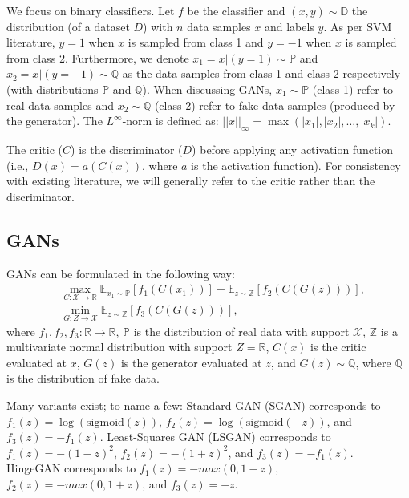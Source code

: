 \documentclass{article}
\begin{document}
We focus on binary classifiers. Let $f$ be the classifier and $(x,y) \sim \mathbb{D}$ the distribution (of a dataset $D$) with $n$ data samples $x$ and labels $y$. As per SVM literature, $y=1$ when $x$ is sampled from class 1 and $y=-1$ when $x$ is sampled from class 2. Furthermore, we denote $x_1 = x | (y = 1) \sim \mathbb{P}$ and $x_2 = x | (y = -1) \sim \mathbb{Q}$ as the data samples from class 1 and class 2 respectively (with distributions $\mathbb{P}$ and $\mathbb{Q}$). When discussing GANs, $x_1 \sim \mathbb{P}$ (class 1) refer to real data samples and $x_2 \sim \mathbb{Q}$ (class 2) refer to fake data samples (produced by the generator). The $L^{\infty}$-norm is defined as: $|| x ||_\infty = \max(|x_1|,|x_2|,\ldots,|x_k|)$.

The critic ($C$) is the discriminator ($D$) before applying any activation function (i.e., $D(x)=a(C(x))$, where $a$ is the activation function).
For consistency with existing literature, we will generally refer to the critic rather than the discriminator.

\subsection{GANs}

GANs can be formulated in the following way:
\begin{align}\label{eqn:3}
&\max_{C: \mathcal{X} \to \mathbb{R}} \mathbb{E}_{x_1 \sim \mathbb{P}}\left[ f_1(C(x_1)) \right] + \mathbb{E}_{z \sim \mathbb{Z}} \left[ f_2(C(G(z))) \right], \\
&\min_{G: Z \to \mathcal{X}} \mathbb{E}_{z \sim \mathbb{Z}} \left[ f_3(C(G(z))) \right],
\end{align}\label{eqn:4}
where $f_1, f_2, f_3:\mathbb{R} \to \mathbb{R}$, $\mathbb{P}$ is the distribution of real data with support $\mathcal{X}$,  $\mathbb{Z}$ is a multivariate normal distribution with support $Z=\mathbb{R}$, $C(x)$ is the critic evaluated at $x$, $G(z)$ is the generator evaluated at $z$, and $G(z) \sim \mathbb{Q}$, where $\mathbb{Q}$ is the distribution of fake data. 

Many variants exist; to name a few: Standard GAN (SGAN) \citep{GAN} corresponds to $f_1(z)=\log(\text{sigmoid}(z))$, $f_2(z)=\log(\text{sigmoid}(-z))$, and $f_3(z)=-f_1(z)$. Least-Squares GAN (LSGAN) \citep{LSGAN} corresponds to $f_1(z)=-(1-z)^2$, $f_2(z)=-(1+z)^2$, and $f_3(z)=-f_1(z)$. HingeGAN \citep{lim2017geometric} corresponds to $f_1(z)=-max(0,1-z)$, $f_2(z)=-max(0,1+z)$, and $f_3(z)=-z$.
\end{document}
